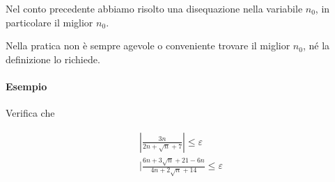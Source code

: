 \documentclass[12pt, a4paper]{article}
\begin{document}
Nel conto precedente abbiamo risolto una disequazione nella variabile $n_0$, in particolare il miglior $n_0$.  

Nella pratica non \`e sempre agevole o conveniente trovare il miglior $n_0$, n\'e la definizione lo richiede.

\paragraph{Esempio} Verifica che 

\begin{eqnarray*}
|\frac{3n}{2n+\sqrt{n} + 7}| \leq \varepsilon \\
 | \frac{6n + 3\sqrt{n} + 21 - 6n}{4n + 2\sqrt{n} +14} \leq \varepsilon
\end{eqnarray*}
\end{document}
